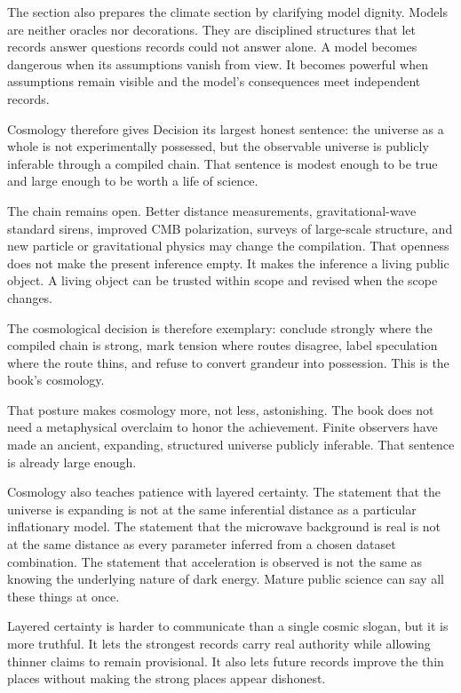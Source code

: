 The section also prepares the climate section by clarifying model dignity.
Models are neither oracles nor decorations. They are disciplined structures
that let records answer questions records could not answer alone. A model
becomes dangerous when its assumptions vanish from view. It becomes powerful
when assumptions remain visible and the model's consequences meet independent
records.

Cosmology therefore gives Decision its largest honest sentence: the universe
as a whole is not experimentally possessed, but the observable universe is
publicly inferable through a compiled chain. That sentence is modest enough
to be true and large enough to be worth a life of science.

The chain remains open. Better distance measurements, gravitational-wave
standard sirens, improved CMB polarization, surveys of large-scale structure,
and new particle or gravitational physics may change the compilation. That
openness does not make the present inference empty. It makes the inference a
living public object. A living object can be trusted within scope and revised
when the scope changes.

The cosmological decision is therefore exemplary: conclude strongly where the
compiled chain is strong, mark tension where routes disagree, label
speculation where the route thins, and refuse to convert grandeur into
possession. This is the book's cosmology.

That posture makes cosmology more, not less, astonishing. The book does not
need a metaphysical overclaim to honor the achievement. Finite observers have
made an ancient, expanding, structured universe publicly inferable. That
sentence is already large enough.

Cosmology also teaches patience with layered certainty. The statement that
the universe is expanding is not at the same inferential distance as a
particular inflationary model. The statement that the microwave background is
real is not at the same distance as every parameter inferred from a chosen
dataset combination. The statement that acceleration is observed is not the
same as knowing the underlying nature of dark energy. Mature public science
can say all these things at once.

Layered certainty is harder to communicate than a single cosmic slogan, but
it is more truthful. It lets the strongest records carry real authority while
allowing thinner claims to remain provisional. It also lets future records
improve the thin places without making the strong places appear dishonest.

